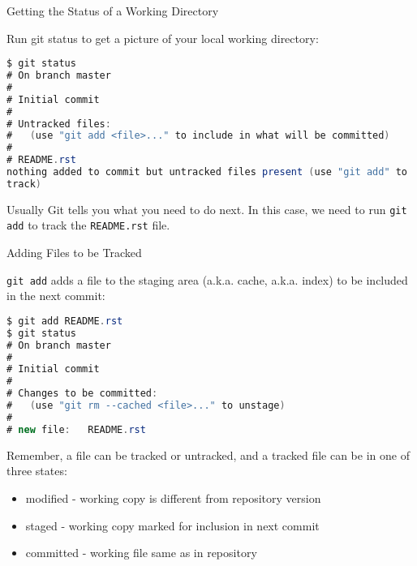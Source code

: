 \documentclass{beamer}
\begin{document}
\begin{frame}[fragile]{Getting the Status of a Working Directory}


Run git status to get a picture of your local working directory:
\begin{lstlisting}[language=Java]
$ git status
# On branch master
#
# Initial commit
#
# Untracked files:
#   (use "git add <file>..." to include in what will be committed)
#
# README.rst
nothing added to commit but untracked files present (use "git add" to
track)
\end{lstlisting}
Usually Git tells you what you need to do next. In this case, we need to run {\tt git add} to track the {\tt README.rst} file.


\end{frame}

\begin{frame}[fragile]{Adding Files to be Tracked}


{\tt git add} adds a file to the staging area (a.k.a. cache, a.k.a. index) to be included in the next commit:

\begin{lstlisting}[language=Java]
$ git add README.rst
$ git status
# On branch master
#
# Initial commit
#
# Changes to be committed:
#   (use "git rm --cached <file>..." to unstage)
#
# new file:   README.rst
\end{lstlisting}

Remember, a file can be tracked or untracked, and a tracked file can be in one of three states:
\begin{itemize}
\item modified - working copy is different from repository version
\item staged - working copy marked for inclusion in next commit
\item committed - working file same as in repository
\end{itemize}

\end{frame}
\end{document}

